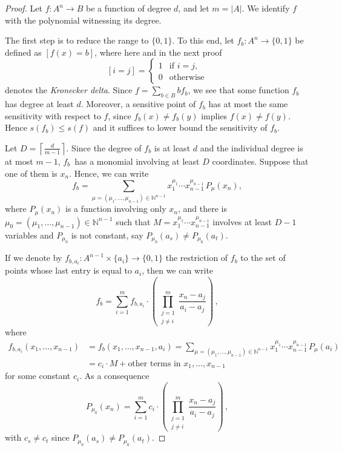 \documentclass[a4paper,10pt]{amsart}
\begin{document}
\begin{proof}
Let $f\colon A^n \to B$ be a function of degree $d$, and let $m=|A|$. We identify $f$ with the polynomial witnessing its degree.

The first step is to reduce the range to $\{0, 1\}$. To this end, let $f_b\colon A^n \to \{0, 1\}$ be defined as $[f(x)=b]$, where here and in the next proof  
\[[i=j]=\begin{cases}
    1 & \text {if } i= j,\\
    0 & \text{otherwise}
\end{cases}\] denotes the \emph{Kronecker delta}. 
Since  $f = \sum_{b \in B} bf_b$, we see that some function $f_b$ has degree at least $d$. Moreover, a sensitive point of $f_b$ has at most the same sensitivity with respect to $f$, since $f_b(x) \neq f_b(y)$ implies $f(x) \neq f(y)$. Hence $s(f_b) \leq s(f)$ and it suffices to lower bound the sensitivity of $f_b$.

Let $D = \left\lceil\frac{d}{m-1}\right\rceil$. Since the degree of $f_b$ is at least $d$ and the individual degree is at most $m-1$, $f_b$~has a monomial involving at least $D$ coordinates. Suppose that one of them is $x_n$. Hence, we can write
\[
 f_b = \sum_{\mu=(\mu_1,\dots,\mu_{n-1})\in\mathbb{N}^{n-1}} x_1^{\mu_1}\cdots x_{n-1}^{\mu_{n-1}}\, P_\mu(x_n),
\]
where $P_\mu(x_n)$ is a function involving only $x_n$, and there is $\mu_0=(\mu_1,\dots,\mu_{n-1})\in\mathbb{N}^{n-1}$ such that $M=x_1^{\mu_1}\cdots x_{n-1}^{\mu_{n-1}}$ involves at least $D - 1$ variables and $P_{\mu_0}$ is not constant, say $P_{\mu_0}(a_s) \neq P_{\mu_0}(a_t)$. 

If we denote by $f_{b,a_i}\colon A^{n-1}\times\{a_i\}\rightarrow\{0,1\}$ the restriction of $f_b$ to the set of points whose last entry is equal to $a_i$, then we can write \[f_b=\sum_{i=1}^m f_{b,a_i}\cdot\left(\prod_{\substack{j=1\\ j\neq i}}^m \frac{x_n-a_j}{a_i-a_j}\right)\, ,\] where 
\begin{align*}
    f_{b,a_i}(x_1,\dots,x_{n-1})&= f_b(x_1,\dots,x_{n-1},a_i)=\sum_{\mu=(\mu_1,\dots,\mu_{n-1})\in\mathbb{N}^{n-1}}x_1^{\mu_1}\cdots x_{n-1}^{\mu_{n-1}}\, P_{\mu}(a_i) \\
    &= c_i\cdot M + \text{other terms in }x_1,\dots,x_{n-1}
\end{align*} for some constant $c_i$. As a consequence \[P_{\mu_0}(x_n)=\sum_{i=1}^mc_i\cdot\left(\prod_{\substack{j=1\\j\neq i}}^m\frac{x_n-a_j}{a_i-a_j}\right)\, ,\] with $c_s\neq c_t$ since $P_{\mu_0}(a_s)\neq P_{\mu_0}(a_t)$.


\end{proof}
\end{document}
